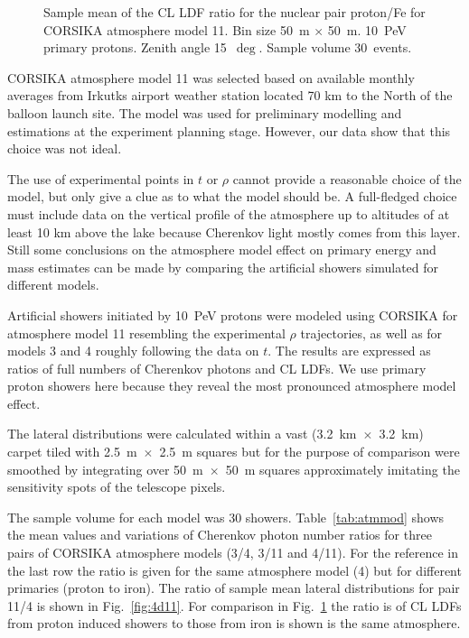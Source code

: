 \documentclass[universe,article,submit,moreauthors,pdftex]{Definitions/mdpi}
\begin{document}
\begin{figure}[tb]
\begin{minipage}[t]{0.48\textwidth}
        \vspace{-1.0pc}
        \caption{Sample mean of the CL LDF ratio for the nuclear pair proton/Fe for CORSIKA atmosphere model 11. Bin size 50~m $\times$ 50~m. 10~PeV primary protons. Zenith angle 15~$\deg$. Sample volume 30~events.}
        \label{fig:pdFe}
    \end{minipage}
\end{figure}


CORSIKA atmosphere model 11 was selected based on available monthly averages from Irkutks airport weather station located 70 km to the North of the balloon launch site. The model was used for preliminary modelling and estimations at the experiment planning stage. However, our data show that this choice was not ideal.

The use of experimental points in $t$ or $\rho$ cannot provide a reasonable choice of the model, but only give a clue as to what the model should be. A full-fledged choice must include data on the vertical profile of the atmosphere up to altitudes of at least 10 km above the lake because Cherenkov light mostly comes from this layer. Still some conclusions on the atmosphere model effect on primary energy and mass estimates can be made by comparing the artificial showers simulated for different models.

Artificial showers initiated by 10~PeV protons were modeled using CORSIKA for atmosphere model 11 resembling the experimental $\rho$ trajectories, as well as for models 3 and 4 roughly following the data on $t$. The results are expressed as ratios of full numbers of Cherenkov photons and CL LDFs. We use primary proton showers here because they reveal the most pronounced atmosphere model effect. 

The lateral distributions were calculated within a vast (3.2~km~$\times$~3.2~km) carpet tiled with 2.5~m~$\times$~2.5~m squares but for the purpose of comparison were smoothed by integrating over 50~m~$\times$~50~m squares approximately imitating the sensitivity spots of the telescope pixels.

The sample volume for each model was 30 showers. Table~\ref{tab:atmmod} shows the mean values and variations of Cherenkov photon number ratios for three pairs of CORSIKA atmosphere models (3/4, 3/11 and 4/11). For the reference in the last row the ratio is given for the same atmosphere model (4) but for different primaries (proton to iron). The ratio of sample mean lateral distributions for pair 11/4 is shown in Fig.~\ref{fig:4d11}. For comparison in Fig.~\ref{fig:pdFe} the ratio is of CL LDFs from proton induced showers to those from iron is shown is the same atmosphere. 
\end{document}
